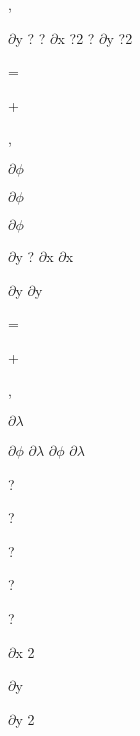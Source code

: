 \documentclass[a4paper,portrait,12pt]{article}
\begin{document}
,





\begin{flushleft}
$\partial$y ? ? $\partial$x ?2 ? $\partial$y ?2
\end{flushleft}


=


+


,


\begin{flushleft}
$\partial$$\phi$
\end{flushleft}


\begin{flushleft}
$\partial$$\phi$
\end{flushleft}


\begin{flushleft}
$\partial$$\phi$
\end{flushleft}


\begin{flushleft}
$\partial$y ? $\partial$x $\partial$x
\end{flushleft}


\begin{flushleft}
$\partial$y $\partial$y
\end{flushleft}


=


+


,


\begin{flushleft}
$\partial$$\lambda$
\end{flushleft}


\begin{flushleft}
$\partial$$\phi$ $\partial$$\lambda$ $\partial$$\phi$ $\partial$$\lambda$
\end{flushleft}


?


?


?


?


?


\begin{flushleft}
$\partial$x 2
\end{flushleft}


\begin{flushleft}
$\partial$y
\end{flushleft}


\begin{flushleft}
$\partial$y 2
\end{flushleft}
\end{document}
